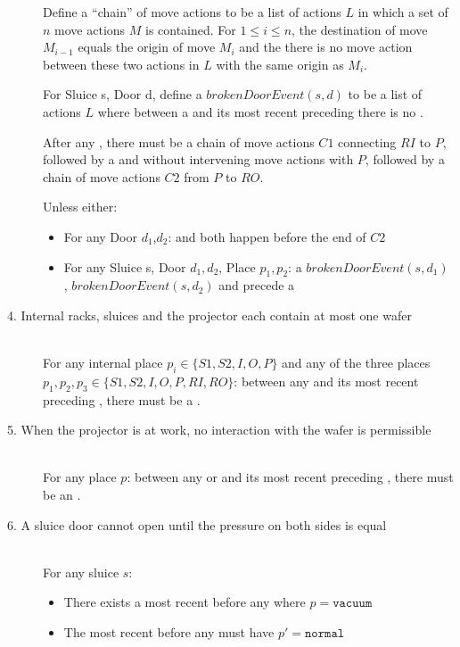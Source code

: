 \begin{description}
 Define a ``chain'' of move actions to be a list of actions $L$  in which a set of $n$ move actions $M$ is contained. For $1 \leq i \leq n$, the destination of move $M_{i-1}$ equals the origin of move $M_{i}$ and the there is no move action between these two actions in $L$ with the same origin as $M_{i}$.
 
For Sluice s, Door d, define a $brokenDoorEvent(s,d)$  to be a list of actions $L$ where between a  and its most recent preceding  there is no .
 
 After any , there must be a chain of move actions $C1$ connecting $RI$ to $P$, followed by a  and  without intervening move actions with $P$, followed by a chain of move actions $C2$ from $P$ to $RO$.
 
 Unless either:
 \begin{itemize}
 \item For any Door $d_1$,$d_2$:  and  both happen before the end of $C2$
 
 \item For any Sluice s, Door $d_1,d_2$, Place $p_1,p_2$: a $brokenDoorEvent(s,d_1)$ , $brokenDoorEvent(s,d_2)$ and   precede a  
 \end{itemize}
 \cbend
 
\item[4. Internal racks, sluices and the projector each contain at most one wafer] \hfill \\
For any internal place $p_i \in \{S1, S2, I, O, P\}$ and any of the three places $p_1, p_2, p_3 \in \{S1, S2, I, O, P, RI, RO\}$: between any  and its most recent preceding , there must be a . 
 
\item[5. When the projector is at work, no interaction with the wafer is permissible] \hfill \\
For any place $p$: between any  or  and its most recent preceding , there must be an . 
 
 \item[6. A sluice door cannot open until the pressure on both sides is equal] \hfill \\
 \cbstart For any sluice $s$:
 \begin{itemize}
  \item There exists a most recent  before any  where $p = \texttt{vacuum}$
  \item The most recent  before any  must have $p' = \texttt{normal}$


\end{itemize}
\end{description}
